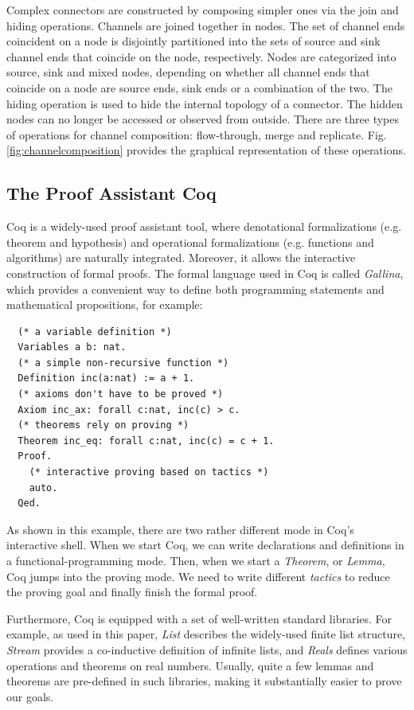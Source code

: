 \documentclass{llncs}
\begin{document}
Complex connectors are constructed by composing simpler ones via the join and hiding operations. Channels are joined together in nodes. The set of channel ends coincident on a node is disjointly partitioned into the sets of source and sink channel ends that coincide on the node, respectively. Nodes are categorized into source, sink and mixed nodes, depending on whether all channel ends that coincide on a node are source ends, sink ends or a combination of the two. The hiding operation is used to hide the internal topology of a connector. The hidden nodes can no longer be accessed or observed from outside. There are three types of operations for channel composition: flow-through, merge and replicate. Fig. \ref{fig:channelcomposition} provides the graphical representation of these operations.

\subsection{The Proof Assistant Coq}
Coq\cite{huet1997coq} is a widely-used proof assistant tool, where denotational formalizations (e.g.
theorem and hypothesis) and operational formalizations (e.g. functions and algorithms) are naturally
integrated. Moreover, it allows the interactive construction of formal proofs.
The formal language used in Coq is called \emph{Gallina}, which provides a convenient way to define
both programming statements and mathematical propositions, for example:
\begin{verbatim}
  (* a variable definition *)
  Variables a b: nat.
  (* a simple non-recursive function *)
  Definition inc(a:nat) := a + 1.
  (* axioms don't have to be proved *)
  Axiom inc_ax: forall c:nat, inc(c) > c.
  (* theorems rely on proving *)
  Theorem inc_eq: forall c:nat, inc(c) = c + 1.
  Proof.
    (* interactive proving based on tactics *)
    auto.
  Qed.
\end{verbatim}

As shown in this example, there are two rather different mode in Coq's interactive shell. When
we start Coq, we can write declarations and definitions in a functional-programming mode. Then, when
we start a \emph{Theorem}, or \emph{Lemma}, Coq jumps into the proving mode. We need to write
different \emph{tactics} to reduce the proving goal and finally finish the formal proof.

Furthermore, Coq is equipped with a set of well-written standard libraries. For example, as used in
this paper, \emph{List} describes the widely-used finite list structure, \emph{Stream} provides a co-inductive
definition of infinite lists, and \emph{Reals} defines various operations and theorems on real
numbers. Usually, quite a few lemmas and theorems are pre-defined in such libraries, making it
substantially easier to prove our goals.
\end{document}

